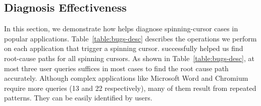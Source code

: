 \subsection{Diagnosis Effectiveness}\label{sec:casestudy}

In this section, we demonstrate how \xxx helps diagnose \nbug
spinning-cursor cases in popular applications. Table~\ref{table:bugs-desc}
describes the operations we perform on each application that trigger a
spinning cursor.  \xxx successfully helped us find root-cause paths for
all spinning cursors.  As shown in Table~\ref{table:bugs-desc}, at most
three user queries suffices in most cases to find the root cause path
accurately. Although complex applications like Microsoft Word and Chromium
require more queries (13 and 22 respectively), many of them result from
repeated patterns. They can be easily identified by users.









